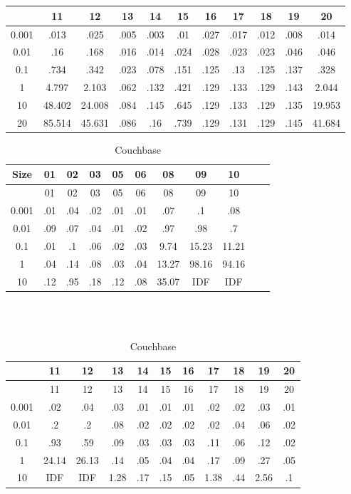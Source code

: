 \begin{center}
\begin{table} [ht]
\begin{tabular}{|c|c|c|c|c|c|c|c|c|c|c| }
\end{tabular}
\\
\\
\begin{tabular}{|c|c|c|c|c|c|c|c|c|c|c| } 
 &  11 & 12 & 13 & 14 & 15 & 16 & 17 & 18 & 19 & 20 \\
 \hline
0.001 &  .013 & .025 & .005 & .003 & .01 & .027 & .017 & .012 & .008 & .014 \\
0.01 &  .16 & .168 & .016 & .014 & .024 & .028 & .023 & .023 & .046 & .046 \\
0.1 &  .734 & .342 & .023 & .078 & .151 & .125 & .13 & .125 & .137 & .328 \\
1 &  4.797 & 2.103 & .062 & .132 & .421 & .129 & .133 & .129 & .143 & 2.044 \\
10 &  48.402 & 24.008 & .084 & .145 & .645 & .129 & .133 & .129 & .135 & 19.953 \\
20 &  85.514 & 45.631 & .086 & .16 & .739 & .129 & .131 & .129 & .145 & 41.684 \\

\end{tabular}
\end{table}

\begin{table} [ht]
\tiny
\caption{Couchbase}
\label{couchbase-query-result-table}
\begin{tabular}{|c|c|c|c|c|c|c|c|c|c|c| } 
 Size  & 01 & 02 & 03 & 05 & 06 & 08 & 09 & 10 \\
 \hline
& 01 & 02 & 03 & 05 & 06 & 08 & 09 & 10 \\
0.001 & .01 & .04 & .02 & .01 & .01 & .07 & .1 & .08 \\
0.01 & .09 & .07 & .04 & .01 & .02 & .97 & .98 & .7 \\
0.1 & .01 & .1 & .06 & .02 & .03 & 9.74 & 15.23 & 11.21 \\
1 & .04 & .14 & .08 & .03 & .04 & 13.27 & 98.16 & 94.16 \\
10 & .12 & .95 & .18 & .12 & .08 & 35.07 & IDF & IDF \\
\end{tabular}
\\
\\
\begin{tabular}{|c|c|c|c|c|c|c|c|c|c|c| } 

 & 11 & 12 & 13 & 14 & 15 & 16 & 17 & 18 & 19 & 20	\\
\hline
 & 11 & 12 & 13 & 14 & 15 & 16 & 17 & 18 & 19 & 20 \\
0.001 & .02 & .04 & .03 & .01 & .01 & .01 & .02 & .02 & .03 & .01 \\
0.01 & .2 & .2 & .08 & .02 & .02 & .02 & .02 & .04 & .06 & .02 \\
0.1 & .93 & .59 & .09 & .03 & .03 & .03 & .11 & .06 & .12 & .02 \\
1 & 24.14 & 26.13 & .14 & .05 & .04 & .04 & .17 & .09 & .27 & .05 \\
10 & IDF & IDF & 1.28 & .17 & .15 & .05 & 1.38 & .44 & 2.56 & .1 \\
\end{tabular}
\end{table}

\end{center}

